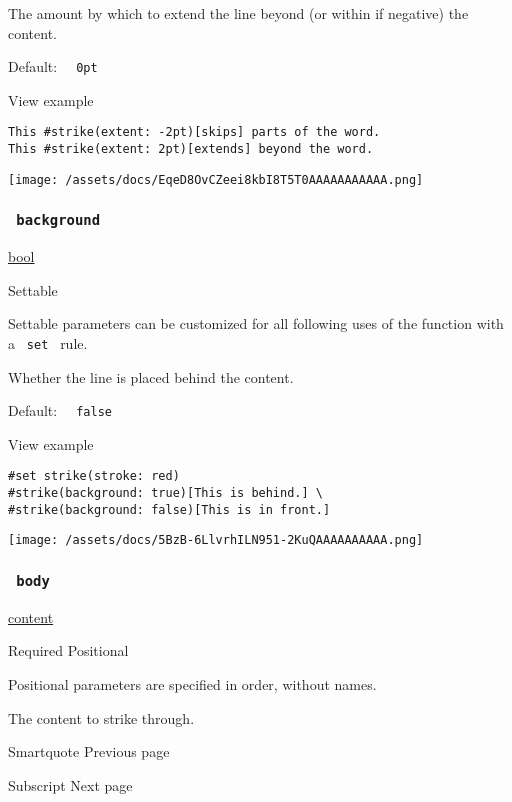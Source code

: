 The amount by which to extend the line beyond (or within if negative)
the content.

Default: \texttt{\ }{\texttt{\ 0pt\ }}\texttt{\ }


View example

\begin{verbatim}
This #strike(extent: -2pt)[skips] parts of the word.
This #strike(extent: 2pt)[extends] beyond the word.
\end{verbatim}

\texttt{[image: /assets/docs/EqeD8OvCZeei8kbI8T5T0AAAAAAAAAAA.png]}

\subsubsection{\texorpdfstring{\texttt{\ background\ }}{ background }}\label{parameters-background}

\href{/docs/reference/foundations/bool/}{bool}

{{ Settable }}

\label{parameters-background-settable-tooltip}
Settable parameters can be customized for all following uses of the
function with a \texttt{\ set\ } rule.

Whether the line is placed behind the content.

Default: \texttt{\ }{\texttt{\ false\ }}\texttt{\ }


View example

\begin{verbatim}
#set strike(stroke: red)
#strike(background: true)[This is behind.] \
#strike(background: false)[This is in front.]
\end{verbatim}

\texttt{[image: /assets/docs/5BzB-6LlvrhILN951-2KuQAAAAAAAAAA.png]}

\subsubsection{\texorpdfstring{\texttt{\ body\ }}{ body }}\label{parameters-body}

\href{/docs/reference/foundations/content/}{content}

{Required} {{ Positional }}

\label{parameters-body-positional-tooltip}
Positional parameters are specified in order, without names.

The content to strike through.

\href{/docs/reference/text/smartquote/}{\pandocbounded{}}

{ Smartquote } { Previous page }

\href{/docs/reference/text/sub/}{\pandocbounded{}}

{ Subscript } { Next page }
